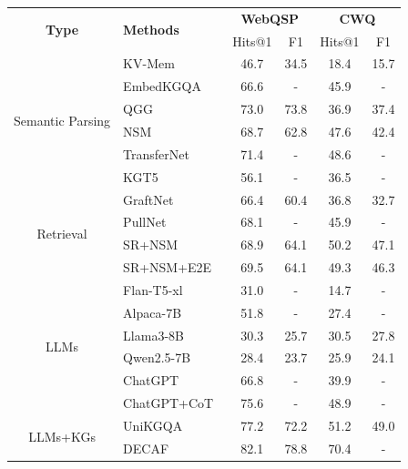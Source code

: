 \begin{table}[t]
\centering
\small
\begin{tabular}{clcccc}
\toprule
\multirow{2}{*}{\textbf{Type}} 
& \multirow{2}{*}{\textbf{Methods}} 
& \multicolumn{2}{c}{\textbf{WebQSP}} 
& \multicolumn{2}{c}{\textbf{CWQ}} \\
& & Hits@1 & F1 & Hits@1 & F1 \\
\midrule
\multirow{6}{*}{Semantic Parsing} 
& KV-Mem~\citep{miller2016key} & 46.7 & 34.5 & 18.4 & 15.7 \\
& EmbedKGQA~\citep{saxena2020improving} & 66.6 & - & 45.9 & - \\
& QGG~\citep{lan2020query} & 73.0 & 73.8 & 36.9 & 37.4 \\
& NSM~\citep{he2021improving} & 68.7 & 62.8 & 47.6 & 42.4 \\
& TransferNet~\citep{shi2021transfernet} & 71.4 & - & 48.6 & - \\
& KGT5~\citep{saxena2022sequence} & 56.1 & - & 36.5 & - \\
\midrule
\multirow{4}{*}{Retrieval} 
& GraftNet~\citep{sun2018open} & 66.4 & 60.4 & 36.8 & 32.7 \\
& PullNet~\citep{sun2019pullnet} & 68.1 & - & 45.9 & - \\
& SR+NSM~\citep{zhang2022subgraph} & 68.9 & 64.1 & 50.2 & 47.1 \\
& SR+NSM+E2E~\citep{zhang2022subgraph} & 69.5 & 64.1 & 49.3 & 46.3 \\
\midrule
\multirow{6}{*}{LLMs} 
& Flan-T5-xl~\cite{chung2024scaling} & 31.0 & - & 14.7 & - \\
& Alpaca-7B~\cite{taori2023stanford} & 51.8 & - & 27.4 & - \\
& Llama3-8B~\citep{dubey2024llama} & 30.3 & 25.7 & 30.5 & 27.8 \\
& Qwen2.5-7B~\citep{team2024qwen2} & 28.4 & 23.7 & 25.9 & 24.1 \\
& ChatGPT~\citep{schulman2022chatgpt} & 66.8 & - & 39.9 & - \\
& ChatGPT+CoT~\citep{wei2022chain} & 75.6 & - & 48.9 & - \\
\midrule
\multirow{13}{*}{LLMs+KGs} 
& UniKGQA~\citep{jiang2022unikgqa} & 77.2 & 72.2 & 51.2 & 49.0 \\
& DECAF~\cite{yu2022decaf} & 82.1 & 78.8 & 70.4 & - \\

\end{tabular}
\end{table}
